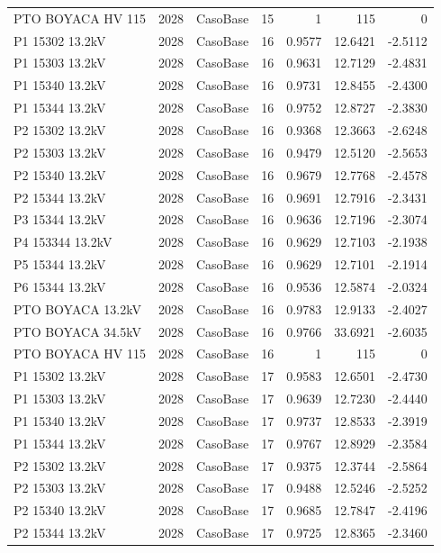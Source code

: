 \documentclass[11pt,a4paper]{article}
\begin{document}
\begin{longtable}{llllrrr}
PTO BOYACA HV 115 & 2028 & CasoBase & 15 & 1 & 115 & 0 \\
P1 15302 13.2kV & 2028 & CasoBase & 16 & 0.9577 & 12.6421 & -2.5112 \\
P1 15303 13.2kV & 2028 & CasoBase & 16 & 0.9631 & 12.7129 & -2.4831 \\
P1 15340 13.2kV & 2028 & CasoBase & 16 & 0.9731 & 12.8455 & -2.4300 \\
P1 15344 13.2kV & 2028 & CasoBase & 16 & 0.9752 & 12.8727 & -2.3830 \\
P2 15302 13.2kV & 2028 & CasoBase & 16 & 0.9368 & 12.3663 & -2.6248 \\
P2 15303 13.2kV & 2028 & CasoBase & 16 & 0.9479 & 12.5120 & -2.5653 \\
P2 15340 13.2kV & 2028 & CasoBase & 16 & 0.9679 & 12.7768 & -2.4578 \\
P2 15344 13.2kV & 2028 & CasoBase & 16 & 0.9691 & 12.7916 & -2.3431 \\
P3 15344 13.2kV & 2028 & CasoBase & 16 & 0.9636 & 12.7196 & -2.3074 \\
P4 153344 13.2kV & 2028 & CasoBase & 16 & 0.9629 & 12.7103 & -2.1938 \\
P5 15344 13.2kV & 2028 & CasoBase & 16 & 0.9629 & 12.7101 & -2.1914 \\
P6 15344 13.2kV & 2028 & CasoBase & 16 & 0.9536 & 12.5874 & -2.0324 \\
PTO BOYACA 13.2kV & 2028 & CasoBase & 16 & 0.9783 & 12.9133 & -2.4027 \\
PTO BOYACA 34.5kV & 2028 & CasoBase & 16 & 0.9766 & 33.6921 & -2.6035 \\
PTO BOYACA HV 115 & 2028 & CasoBase & 16 & 1 & 115 & 0 \\
P1 15302 13.2kV & 2028 & CasoBase & 17 & 0.9583 & 12.6501 & -2.4730 \\
P1 15303 13.2kV & 2028 & CasoBase & 17 & 0.9639 & 12.7230 & -2.4440 \\
P1 15340 13.2kV & 2028 & CasoBase & 17 & 0.9737 & 12.8533 & -2.3919 \\
P1 15344 13.2kV & 2028 & CasoBase & 17 & 0.9767 & 12.8929 & -2.3584 \\
P2 15302 13.2kV & 2028 & CasoBase & 17 & 0.9375 & 12.3744 & -2.5864 \\
P2 15303 13.2kV & 2028 & CasoBase & 17 & 0.9488 & 12.5246 & -2.5252 \\
P2 15340 13.2kV & 2028 & CasoBase & 17 & 0.9685 & 12.7847 & -2.4196 \\
P2 15344 13.2kV & 2028 & CasoBase & 17 & 0.9725 & 12.8365 & -2.3460 \\

\end{longtable}
\end{document}
